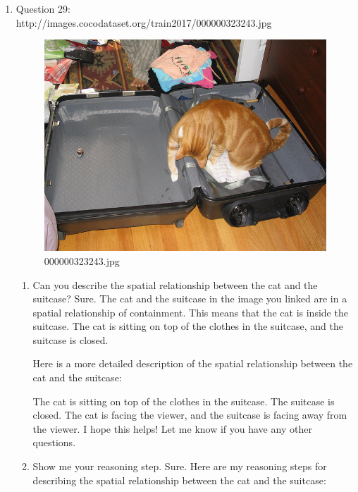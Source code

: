 \begin{enumerate}
\begin{enumerate}
        I hope this explanation is helpful! Let me know if you have any other questions.
    \end{enumerate}
    \item Question 29:\\http://images.cocodataset.org/train2017/000000323243.jpg
    \begin{figure}[h]
        \centering
        \includegraphics[width=0.8\linewidth]{../image set/easy/000000323243.jpg}
        \caption{000000323243.jpg}
    \end{figure}
    \begin{enumerate}
        \item Can you describe the spatial relationship between the cat and the suitcase?
        \subitem Sure. The cat and the suitcase in the image you linked are in a spatial relationship of containment. This means that the cat is inside the suitcase. The cat is sitting on top of the clothes in the suitcase, and the suitcase is closed.

        Here is a more detailed description of the spatial relationship between the cat and the suitcase:
        
        The cat is sitting on top of the clothes in the suitcase.
        The suitcase is closed.
        The cat is facing the viewer, and the suitcase is facing away from the viewer.
        I hope this helps! Let me know if you have any other questions.
        \item Show me your reasoning step.
        \subitem 
        Sure. Here are my reasoning steps for describing the spatial relationship between the cat and the suitcase:
        

\end{enumerate}
\end{enumerate}
